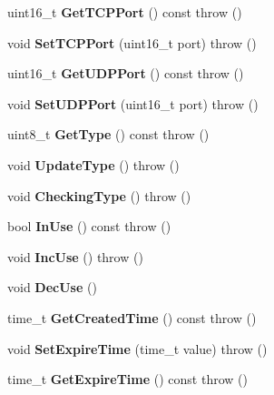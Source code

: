 \begin{DoxyCompactItemize}
\item 
uint16\_\-t {\bfseries GetTCPPort} () const   throw ()\label{classKademlia_1_1CContact_af0fe22abb87856a841acac41f1ecd6c4}

\item 
void {\bfseries SetTCPPort} (uint16\_\-t port)  throw ()\label{classKademlia_1_1CContact_a188a1b64996df70be183041fa6474ef2}

\item 
uint16\_\-t {\bfseries GetUDPPort} () const   throw ()\label{classKademlia_1_1CContact_af4e924ff8d65294ba7cca6ec4960055b}

\item 
void {\bfseries SetUDPPort} (uint16\_\-t port)  throw ()\label{classKademlia_1_1CContact_ad967a9ca769afd3c27ddc933425e5cc7}

\item 
uint8\_\-t {\bfseries GetType} () const   throw ()\label{classKademlia_1_1CContact_a6d9383e566eff919809df5fae3d15a0c}

\item 
void {\bfseries UpdateType} ()  throw ()\label{classKademlia_1_1CContact_a3f3b30ca51fd4a2516ca3bde2156de77}

\item 
void {\bfseries CheckingType} ()  throw ()\label{classKademlia_1_1CContact_a9133d10d2df193b445a9569ee7d53e60}

\item 
bool {\bfseries InUse} () const   throw ()\label{classKademlia_1_1CContact_a9f3f241f0186982a63e162730ed4bdd3}

\item 
void {\bfseries IncUse} ()  throw ()\label{classKademlia_1_1CContact_ac3ecc4f6421ba2ba8485be1cafac8221}

\item 
void {\bfseries DecUse} ()\label{classKademlia_1_1CContact_af70ebb86002524eec3e58eda00a74346}

\item 
time\_\-t {\bfseries GetCreatedTime} () const   throw ()\label{classKademlia_1_1CContact_aa42ce5bd3b289d84bf1be184834ae92c}

\item 
void {\bfseries SetExpireTime} (time\_\-t value)  throw ()\label{classKademlia_1_1CContact_ae07e8d59553aade6459feb5a76ad9e83}

\item 
time\_\-t {\bfseries GetExpireTime} () const   throw ()\label{classKademlia_1_1CContact_afe289e3e48ac1b311f421cee5b2bf34f}


\end{DoxyCompactItemize}
